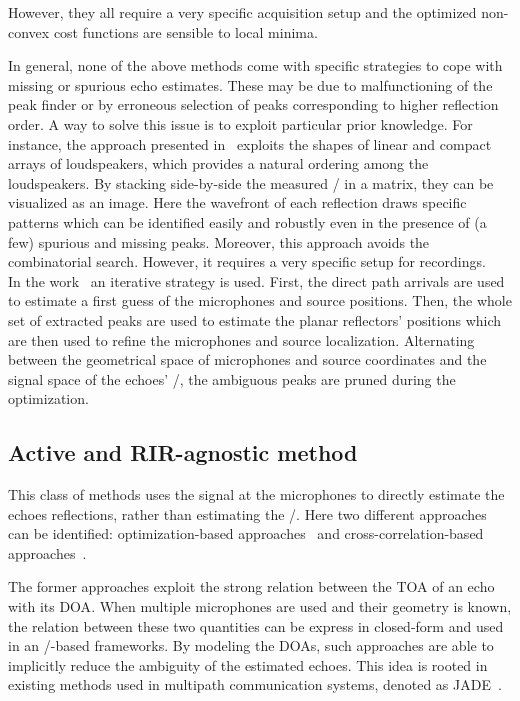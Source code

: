 However, they all require a very specific acquisition setup and the optimized non-convex cost functions are sensible to local minima.

\mynewline
In general, none of the above methods come with specific strategies to cope with missing or spurious echo estimates.
These may be due to malfunctioning of the peak finder or by erroneous selection of peaks corresponding to higher reflection order.
A way to solve this issue is to exploit particular prior knowledge.
For instance, the approach presented in~ exploits the shapes of linear and compact arrays of loudspeakers, which provides a natural ordering among the loudspeakers.
By stacking side-by-side the measured \RIRs/ in a matrix, they can be visualized as an image.
Here the wavefront of each reflection draws specific patterns which can be identified easily and robustly even in the presence of (a few) spurious and missing peaks.
Moreover, this approach avoids the combinatorial search.
However, it requires a very specific setup for recordings.
\\In the work~ an iterative strategy is used.
First, the direct path arrivals are used to estimate a first guess of the microphones and source positions.
Then, the whole set of extracted peaks are used to estimate the planar reflectors' positions which are then used to refine the microphones and source localization.
Alternating between the geometrical space of microphones and source coordinates and the signal space of the echoes' \TOAs/, the ambiguous peaks are pruned during the optimization.

\subsection{Active and RIR-agnostic method}\label{subsec:estimation:active_agnostic}
This class of methods uses the signal at the microphones to directly estimate the echoes reflections, rather than estimating the \RIRs/.
Here two different approaches can be identified: optimization-based approaches~ and cross-correlation-based approaches~.

\mynewline
The former approaches exploit the strong relation between the \ac{TOA} of an echo with its \ac{DOA}.
When multiple microphones are used and their geometry is known, the relation between these two quantities can be express in closed-form and used in an \ML/-based frameworks.
By modeling the \ac{DOA}s, such approaches are able to implicitly reduce the ambiguity of the estimated echoes.
This idea is rooted in existing methods used in multipath communication systems, denoted as \ac{JADE}~.

